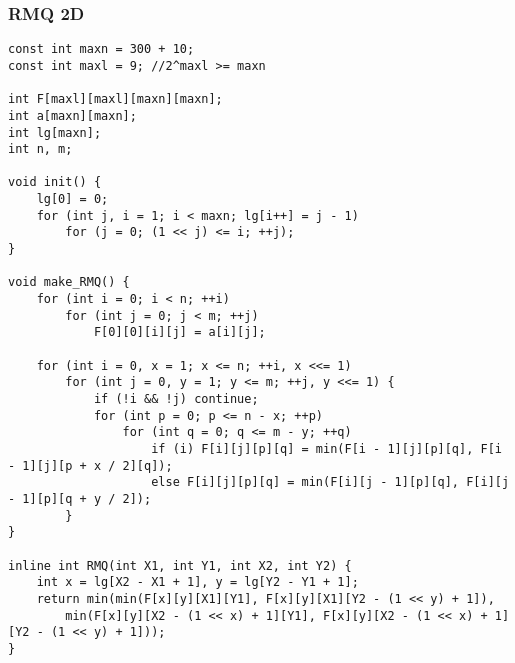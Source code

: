 \subsubsection{RMQ 2D}
\begin{verbatim}
const int maxn = 300 + 10;
const int maxl = 9; //2^maxl >= maxn

int F[maxl][maxl][maxn][maxn];
int a[maxn][maxn];
int lg[maxn];
int n, m;

void init() {
    lg[0] = 0;
    for (int j, i = 1; i < maxn; lg[i++] = j - 1)
        for (j = 0; (1 << j) <= i; ++j);
}

void make_RMQ() {
    for (int i = 0; i < n; ++i)
        for (int j = 0; j < m; ++j)
            F[0][0][i][j] = a[i][j];

    for (int i = 0, x = 1; x <= n; ++i, x <<= 1)
        for (int j = 0, y = 1; y <= m; ++j, y <<= 1) {
            if (!i && !j) continue;
            for (int p = 0; p <= n - x; ++p)
                for (int q = 0; q <= m - y; ++q)
                    if (i) F[i][j][p][q] = min(F[i - 1][j][p][q], F[i - 1][j][p + x / 2][q]);
                    else F[i][j][p][q] = min(F[i][j - 1][p][q], F[i][j - 1][p][q + y / 2]);
        }
}

inline int RMQ(int X1, int Y1, int X2, int Y2) {
    int x = lg[X2 - X1 + 1], y = lg[Y2 - Y1 + 1];
    return min(min(F[x][y][X1][Y1], F[x][y][X1][Y2 - (1 << y) + 1]),
        min(F[x][y][X2 - (1 << x) + 1][Y1], F[x][y][X2 - (1 << x) + 1][Y2 - (1 << y) + 1]));
}
\end{verbatim}
